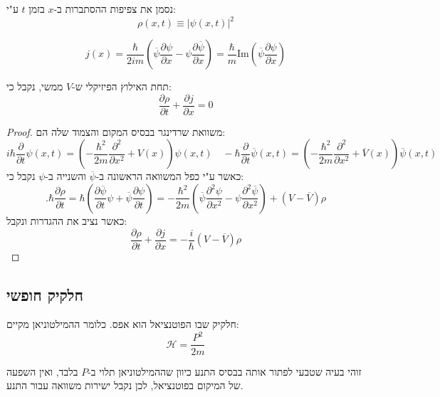 \documentclass{tstextbook}
\begin{document}
\begin{definition}
נסמן את צפיפות ההסתברות ב-\(x\) בזמן \(t\) ע"י:
$$\rho\left(x,t\right)\equiv\left|\psi\left(x,t\right)\right|^{2}$$

\end{definition}
\begin{definition}
$$j\left(x\right)=\frac\hbar{2i m}\left(\overline{{{\psi}}}\frac{\partial\psi}{\partial x}-\psi\frac{\partial\overline{{{\psi}}}}{\partial x}\right)=\frac\hbar m\mathrm{Im}\left(\overline{{{\psi}}}\frac{\partial\psi}{\partial x}\right)$$

\end{definition}
\begin{proposition}
תחת האילוץ הפיזיקלי ש-\(V\) ממשי, נקבל כי:
$${\frac{\partial\rho}{\partial t}}+{\frac{\partial j}{\partial x}}=0$$

\end{proposition}
\begin{proof}
משוואת שרדינגר בבסיס המקום והצמוד שלה הם:
$$i\hbar\frac{\partial}{\partial t}\psi\left(x,t\right)=\left(-\frac{\hbar^{2}}{2m}\frac{\partial^{2}}{\partial x^{2}}+V\left(x\right)\right)\psi\left(x,t\right)\quad -\left.\hbar{\frac{\partial}{\partial t}}{\overline{{\psi}}}\left(x,t\right)=\left(-{\frac{\hbar^{2}}{2m}}{\frac{\partial^{2}}{\partial x^{2}}}+{\overline{{V}}}\left(x\right)\right){\overline{{\psi}}}\left(x,t\right)\right.$$
כאשר ע"י כפל המשוואה הראשונה ב-\(\overline{\psi}\) והשנייה ב-\(\psi\) נקבל כי:
$$.\hbar{\frac{\partial\rho}{\partial t}}=\hbar\left({\frac{\partial{\overline{{\psi}}}}{\partial t}}\psi+{\overline{{\psi}}}{\frac{\partial\psi}{\partial t}}\right)=-{\frac{\hbar^{2}}{2m}}\left({\overline{{\psi}}}{\frac{\partial^{2}\psi}{\partial x^{2}}}-\psi{\frac{\partial^{2}{\overline{{\psi}}}}{\partial x^{2}}}\right)+\left(V-{\overline{{V}}}\right)\rho$$
כאשר נציב את ההגדרות ונקבל:
$${\frac{\partial\rho}{\partial t}}+{\frac{\partial j}{\partial x}}=-{\frac{i}{\hbar}}\left(V-{\overline{{V}}}\right)\rho$$

\end{proof}
\subsection{חלקיק חופשי}

\begin{definition}
חלקיק שבו הפוטנציאל הוא אפס. כלומר ההמילטוניאן מקיים:
$$\mathcal{H}= \frac{P^{2}}{2m}$$

\end{definition}
זוהי בעיה שטבעי לפתור אותה בבסיס התנע כיוון שההמילטוניאן תלוי ב-\(P\) בלבד, ואין השפעה של המיקום בפוטנציאל, לכן נקבל ישירות משוואה עבור התנע.
\end{document}
